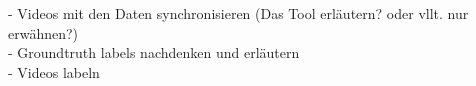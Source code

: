 - Videos mit den Daten synchronisieren (Das Tool erläutern? oder vllt. nur erwähnen?)\\
- Groundtruth labels nachdenken und erläutern\\
- Videos labeln\\
















